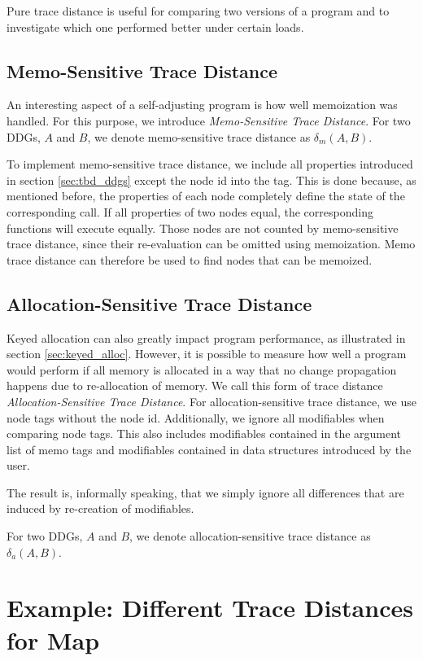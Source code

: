 Pure trace distance is useful for comparing two versions of a program and to investigate which one performed better under certain loads.

\subsection{Memo-Sensitive Trace Distance}

An interesting aspect of a self-adjusting program is how well memoization was handled. For this purpose, we introduce \textit{Memo-Sensitive Trace Distance}. For two DDGs, $A$ and $B$, we denote memo-sensitive trace distance as $\delta_m(A, B)$.

To implement memo-sensitive trace distance, we include all properties introduced in section \ref{sec:tbd_ddgs} except the node id into the tag. This is done because, as mentioned before, the properties of each node completely define the state of the corresponding call. If all properties of two nodes equal, the corresponding functions will execute equally. Those nodes are not counted by memo-sensitive trace distance, since their re-evaluation can be omitted using memoization. Memo trace distance can therefore be used to find nodes that can be memoized.  

\subsection{Allocation-Sensitive Trace Distance}

Keyed allocation can also greatly impact program performance, as illustrated in section \ref{sec:keyed_alloc}. However, it is possible to measure how well a program would perform if all memory is allocated in a way that no change propagation happens due to re-allocation of memory. We call this form of trace distance \textit{Allocation-Sensitive Trace Distance}. For allocation-sensitive trace distance, we use node tags without the node id. Additionally, we ignore all modifiables when comparing node tags. This also includes modifiables contained in the argument list of memo tags and modifiables contained in data structures introduced by the user.

The result is, informally speaking, that we simply ignore all differences that are induced by re-creation of modifiables.  

For two DDGs, $A$ and $B$, we denote allocation-sensitive trace distance as $\delta_a(A, B)$. 

\section{Example: Different Trace Distances for Map}

